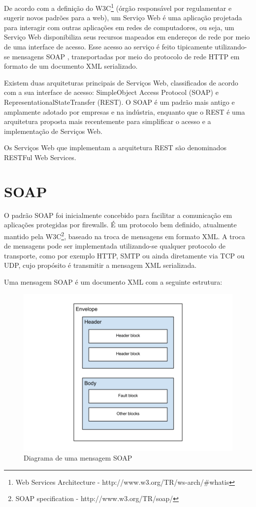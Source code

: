   De acordo com a definição do W3C\footnote{Web Services Architecture - http://www.w3.org/TR/ws-arch/\#whatis} (órgão responsável por regulamentar e sugerir novos padrões para a web), um Serviço Web é uma aplicação projetada para interagir com outras aplicações em redes de computadores, ou seja, um Serviço Web disponibiliza seus recursos mapeados em endereços de rede por meio de uma interface de acesso. Esse acesso ao serviço é feito tipicamente utilizando-se mensagens SOAP , transportadas por meio do protocolo de rede HTTP em formato de um documento XML serializado.

\par
Existem duas arquiteturas principais de Serviços Web, classificados de acordo com a sua interface de acesso: SimpleObject Access Protocol (SOAP) e RepresentationalStateTransfer (REST). O SOAP é um padrão mais antigo e amplamente adotado por empresas e na indústria, enquanto que o REST é uma arquitetura proposta mais recentemente para simplificar o acesso e a implementação de Serviços Web.

\par
Os Serviços Web que implementam a arquitetura REST são denominados RESTFul Web Services.

\section{SOAP}
\label{sec:soap}

O padrão SOAP foi inicialmente concebido para facilitar a comunicação em aplicações protegidas por firewalls. É um protocolo bem definido, atualmente mantido pela W3C\footnote{SOAP specification - http://www.w3.org/TR/soap/}, baseado na troca de mensagens em formato XML. A troca de mensagens pode ser implementada utilizando-se qualquer protocolo de transporte, como por exemplo HTTP, SMTP ou ainda diretamente via TCP ou UDP, cujo propósito é transmitir a mensagem XML serializada.

\par
Uma mensagem SOAP é um documento XML com a seguinte estrutura:

\begin{figure}[H]\centering
  \centerline{\includegraphics[width=\textwidth]{figuras/soap.png}}
  \caption{Diagrama de uma mensagem SOAP}\label{fig:soap}
\end{figure}

